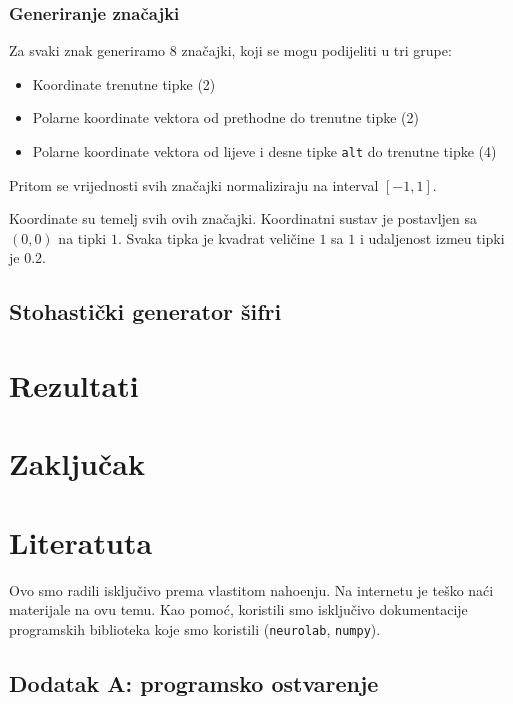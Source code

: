 \documentclass[a4paper,twocolumn,dvipdfm]{article}
\begin{document}
\subsubsection{Generiranje zna\v{c}ajki}

Za svaki znak generiramo 8 zna\v{c}ajki, koji se mogu podijeliti u tri grupe:
\begin{itemize}
        \item Koordinate trenutne tipke (2)
        \item Polarne koordinate vektora od prethodne do trenutne tipke (2)
        \item Polarne koordinate vektora od lijeve i desne tipke \texttt{alt}
            do trenutne tipke (4)
\end{itemize}
Pritom se vrijednosti svih zna\v{c}ajki normaliziraju na interval $[-1, 1]$.

Koordinate su temelj svih ovih zna\v{c}ajki. Koordinatni sustav je postavljen
sa $(0,0)$ na tipki $1$. Svaka tipka je kvadrat veli\v{c}ine $1$ sa $1$ i udaljenost izme\dj u 
tipki je $0.2$.

\subsection{Stohasti\v{c}ki generator \v{s}ifri}

\section{Rezultati}

\section{Zaklju\v{c}ak}

\section*{Literatuta}

Ovo smo radili isklju\v{c}ivo prema vlastitom naho\dj enju. Na internetu
je te\v{s}ko na\'ci materijale na ovu temu. Kao pomo\'c, koristili smo
isklju\v{c}ivo dokumentacije programskih biblioteka koje smo koristili
(\texttt{neurolab}, \texttt{numpy}).

\subsection*{Dodatak A: programsko ostvarenje}
\end{document}
